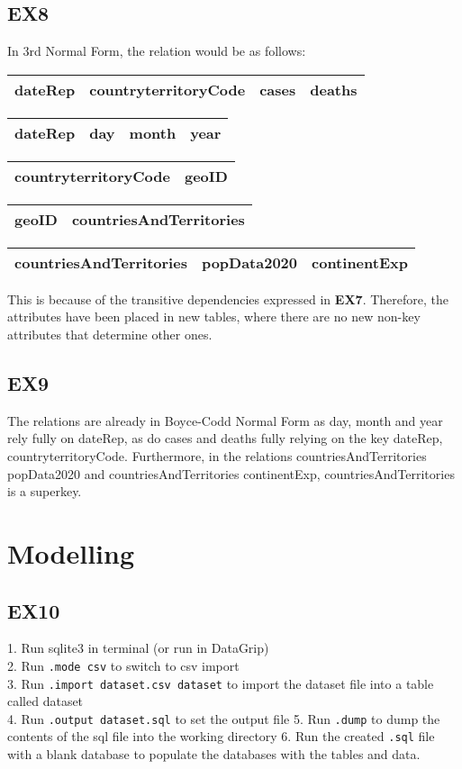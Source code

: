 \documentclass{article}
\begin{document}
\subsection{EX8}
In 3rd Normal Form, the relation would be as follows:
\begin{longtable}{|c|c|c|c|}
\hline
\textbf{dateRep}& \textbf{countryterritoryCode} & \textbf{cases} & \textbf{deaths}\\
\hline
\end{longtable}
\begin{longtable}{|c|c|c|c|}
\hline
\textbf{dateRep} & \textbf{day} & \textbf{month}& \textbf{year}\\
\hline
\end{longtable}
\begin{longtable}{|c|c|}
\hline
\textbf{countryterritoryCode} & \textbf{geoID}\\
\hline
\end{longtable}
\begin{longtable}{|c|c|}
\hline
\textbf{geoID} & \textbf{countriesAndTerritories}\\
\hline
\end{longtable}
\begin{longtable}{|c|c|c|}
\hline
\textbf{countriesAndTerritories} & \textbf{popData2020} & \textbf{continentExp}\\
\hline
\end{longtable}

This is because of the transitive dependencies expressed in \textbf{EX7}. Therefore, the attributes have been placed in new tables, where there are no new non-key attributes that determine other ones. 

\subsection{EX9}
The relations are already in Boyce-Codd Normal Form as day, month and year rely fully on dateRep, as do cases and deaths fully relying on the key dateRep, countryterritoryCode. Furthermore, in the relations countriesAndTerritories \rightarrow popData2020 and countriesAndTerritories \rightarrow continentExp, countriesAndTerritories is a superkey.
\\

\section{Modelling}

\subsection{EX10}
1. Run sqlite3 in terminal (or run in DataGrip)\\
2. Run \texttt{.mode csv} to switch to csv import \\
3. Run \texttt{.import dataset.csv dataset} to import the dataset file into a table called dataset \\
4. Run \texttt{.output dataset.sql} to set the output file
5. Run \texttt{.dump} to dump the contents of the sql file into the working directory
6. Run the created \texttt{.sql} file with a blank database to populate the databases with the tables and data.
\end{document}
